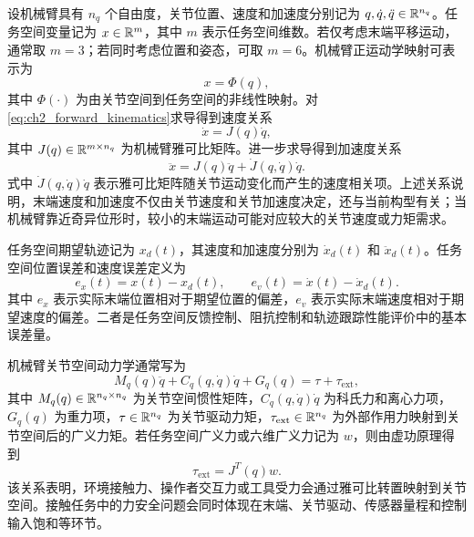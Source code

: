 设机械臂具有 $n_q$ 个自由度，关节位置、速度和加速度分别记为 $q,\dot q,\ddot q\in\mathbb{R}^{n_q}$。任务空间变量记为 $x\in\mathbb{R}^m$，其中 $m$ 表示任务空间维数。若仅考虑末端平移运动，通常取 $m=3$；若同时考虑位置和姿态，可取 $m=6$。机械臂正运动学映射可表示为
\begin{equation}
  x=\Phi(q),
  \label{eq:ch2_forward_kinematics}
\end{equation}
其中 $\Phi(\cdot)$ 为由关节空间到任务空间的非线性映射。对\eqref{eq:ch2_forward_kinematics}求导得到速度关系
\begin{equation}
  \dot x=J(q)\dot q,
  \label{eq:ch2_jacobian_velocity}
\end{equation}
其中 $J(q)\in\mathbb{R}^{m\times n_q}$ 为机械臂雅可比矩阵。进一步求导得到加速度关系
\begin{equation}
  \ddot x=J(q)\ddot q+\dot J(q,\dot q)\dot q .
  \label{eq:ch2_jacobian_acceleration}
\end{equation}
式中 $\dot J(q,\dot q)\dot q$ 表示雅可比矩阵随关节运动变化而产生的速度相关项。上述关系说明，末端速度和加速度不仅由关节速度和关节加速度决定，还与当前构型有关；当机械臂靠近奇异位形时，较小的末端运动可能对应较大的关节速度或力矩需求。

\begin{definition}[任务空间误差变量]
\label{def:ch2_task_error}
任务空间期望轨迹记为 $x_d(t)$，其速度和加速度分别为 $\dot x_d(t)$ 和 $\ddot x_d(t)$。任务空间位置误差和速度误差定义为
\begin{equation}
  e_x(t)=x(t)-x_d(t),\qquad e_v(t)=\dot x(t)-\dot x_d(t).
  \label{eq:ch2_basic_errors}
\end{equation}
其中 $e_x$ 表示实际末端位置相对于期望位置的偏差，$e_v$ 表示实际末端速度相对于期望速度的偏差。二者是任务空间反馈控制、阻抗控制和轨迹跟踪性能评价中的基本误差量。
\end{definition}

机械臂关节空间动力学通常写为
\begin{equation}
  M_q(q)\ddot q+C_q(q,\dot q)\dot q+G_q(q)=\tau+\tau_{\mathrm{ext}},
  \label{eq:ch2_joint_dynamics}
\end{equation}
其中 $M_q(q)\in\mathbb{R}^{n_q\times n_q}$ 为关节空间惯性矩阵，$C_q(q,\dot q)\dot q$ 为科氏力和离心力项，$G_q(q)$ 为重力项，$\tau\in\mathbb{R}^{n_q}$ 为关节驱动力矩，$\tau_{\mathrm{ext}}\in\mathbb{R}^{n_q}$ 为外部作用力映射到关节空间后的广义力矩。若任务空间广义力或六维广义力记为 $w$，则由虚功原理得到
\begin{equation}
  \tau_{\mathrm{ext}}=J^T(q)w .
  \label{eq:ch2_jacobian_transpose}
\end{equation}
该关系表明，环境接触力、操作者交互力或工具受力会通过雅可比转置映射到关节空间。接触任务中的力安全问题会同时体现在末端、关节驱动、传感器量程和控制输入饱和等环节。

